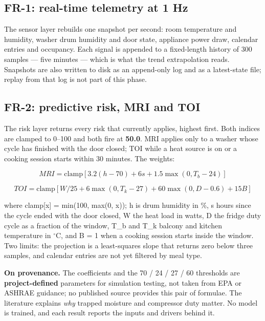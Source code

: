 \documentclass[conference]{IEEEtran}
\begin{document}
\subsection{FR-1: real-time telemetry at 1 Hz}

The sensor layer rebuilds one snapshot per second: room temperature and humidity, washer drum humidity and door state, appliance power draw, calendar entries and occupancy. Each signal is appended to a fixed-length history of 300 samples --- five minutes --- which is what the trend extrapolation reads. Snapshots are also written to disk as an append-only log and as a latest-state file; replay from that log is not part of this phase.

\subsection{FR-2: predictive risk, MRI and TOI}

The risk layer returns every risk that currently applies, highest first. Both indices are clamped to 0--100 and both fire at \textbf{50.0}. MRI applies only to a washer whose cycle has finished with the door closed; TOI while a heat source is on or a cooking session starts within 30 minutes. The weights:

{\small\setlength{\abovedisplayskip}{2pt}\setlength{\belowdisplayskip}{2pt}\setlength{\abovedisplayshortskip}{1pt}\setlength{\belowdisplayshortskip}{1pt}
\[MRI = \mathrm{clamp}[3.2(h-70) + 6s + 1.5\max(0,T_b-24)]\]
}

{\small\setlength{\abovedisplayskip}{2pt}\setlength{\belowdisplayskip}{2pt}\setlength{\abovedisplayshortskip}{1pt}\setlength{\belowdisplayshortskip}{1pt}
\[TOI = \mathrm{clamp}[W/25{+}6\max(0,T_k{-}27){+}60\max(0,D{-}0.6){+}15B]\]
}

where clamp[x] = min(100, max(0, x)); h is drum humidity in \%, s hours since the cycle ended with the door closed, W the heat load in watts, D the fridge duty cycle as a fraction of the window, T\_b and T\_k balcony and kitchen temperature in $^{\circ}$C, and B = 1 when a cooking session starts inside the window. Two limits: the projection is a least-squares slope that returns zero below three samples, and calendar entries are not yet filtered by meal type.

\textbf{On provenance.} The coefficients and the 70 / 24 / 27 / 60 thresholds are \textbf{project-defined} parameters for simulation testing, not taken from EPA or ASHRAE guidance; no published source provides this pair of formulae. The literature explains \emph{why} trapped moisture and compressor duty matter. No model is trained, and each result reports the inputs and drivers behind it.
\end{document}
